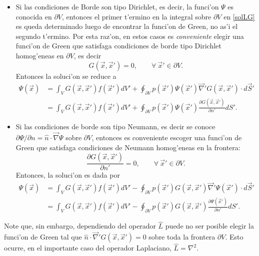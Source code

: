 \begin{itemize}
\item Si las condiciones de Borde son tipo Dirichlet, es decir, la funci'on $\Psi$ es conocida en $\partial V$, entonces el primer t'ermino en la integral sobre $\partial V$ en \eqref{solLG} es queda determinado luego de encontrar la funci'on de Green, no as'i el segundo t'ermino. Por esta raz'on, en estos casos es \textit{conveniente} elegir una funci'on de Green que satisfaga condiciones de borde tipo Dirichlet homog'eneas en $\partial V$, es decir
\begin{equation}
G(\vec{x},\vec{x}')=0, \qquad \forall\ \vec{x}'\in\partial V.
\end{equation}
Entonces la soluci'on se reduce a
\begin{align}
\Psi(\vec{x}) &= \int_VG(\vec{x},\vec{x}')f(\vec{x}')dV'+\oint_{\partial V}p(\vec{x}')\Psi(\vec{x}')\vec\nabla' G(\vec{x},\vec{x}')\cdot d\vec{S}' \\
&= \int_VG(\vec{x},\vec{x}')f(\vec{x}')dV'+\oint_{\partial V}p(\vec{x}')\Psi(\vec{x}')\frac{\partial G(\vec{x},\vec{x}')}{\partial n'}dS'.
\end{align}

\item Si las condiciones de borde son tipo Neumann, es decir se conoce $\partial\Psi/\partial n=\hat{n}\cdot\vec\nabla\Psi$ sobre $\partial V$, entonces es conveniente escoger una funci'on de Green que satisfaga condiciones de Neumann homog'eneas en la frontera:
\begin{equation}
\frac{\partial G(\vec{x},\vec{x}')}{\partial n'}=0, \qquad \forall\ \vec{x}'\in\partial V.
\end{equation}
Entonces, la soluci'on es dada por
\begin{align}
\Psi(\vec{x}) &= \int_VG(\vec{x},\vec{x}')f(\vec{x}')dV'-\oint_{\partial V}p(\vec{x}')G(\vec{x},\vec{x}')\vec\nabla'\Psi(\vec{x}')\cdot d\vec{S}' \\
&= \int_VG(\vec{x},\vec{x}')f(\vec{x}')dV'-\oint_{\partial V}p(\vec{x}')G(\vec{x},\vec{x}')\frac{\partial \Psi(\vec{x}')}{\partial n'}dS'.
\end{align}
\end{itemize}

Note que, sin embargo, dependiendo del operador $\hat{L}$ puede no ser posible elegir la funci'on de Green tal que $\hat{n}\cdot\vec\nabla'G(\vec{x},\vec{x}')=0$ sobre toda la frontera $\partial V$. Esto ocurre, en el importante caso del operador Laplaciano, $\hat{L}=\nabla^2$.

